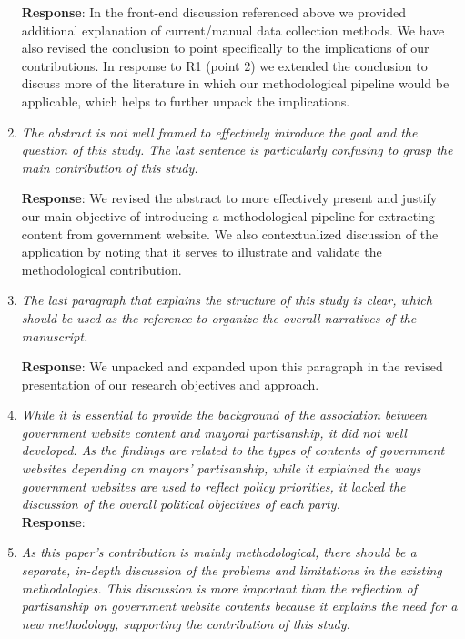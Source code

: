 \documentclass[12pt,titlepage]{article}
\begin{document}
\begin{enumerate}
    
    \textbf{Response}: In the front-end discussion referenced above we provided additional explanation of current/manual data collection methods. We have also revised the conclusion to point specifically to the implications of our contributions. In response to R1 (point 2) we extended the conclusion to discuss more of the literature in which our methodological pipeline would be applicable, which helps to further unpack the implications.
    
    

\item \emph{The abstract is not well framed to effectively introduce the goal and the question of this study. The last sentence is particularly confusing to grasp the main contribution of this study.}

     \textbf{Response}:  We revised the abstract to more effectively present and justify our main objective of introducing a methodological pipeline for extracting content from government website. We also contextualized discussion of the application by noting that it serves to illustrate and validate the methodological contribution.


\item \emph{The last paragraph that explains the structure of this study is clear, which should be used as the reference to organize the overall narratives of the manuscript.}

     \textbf{Response}: We unpacked and expanded upon this paragraph in the revised presentation of our research objectives and approach. 


\item \emph{ While it is essential to provide the background of the association between government website content and mayoral partisanship, it did not well developed. As the findings are related to the types of contents of government websites depending on mayors’ partisanship, while it explained the ways government websites are used to reflect policy priorities, it lacked the discussion of the overall political objectives of each party. }\\

    \textbf{Response}: 
    
    \item \emph{As this paper’s contribution is mainly methodological, there should be a separate, in-depth discussion of the problems and limitations in the existing methodologies. This discussion is more important than the reflection of partisanship on government website contents because it explains the need for a new methodology, supporting the contribution of this study.}\\


\end{enumerate}
\end{document}
